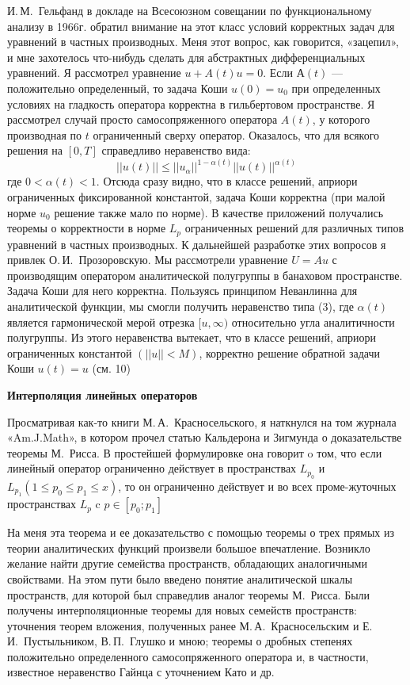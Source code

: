 И.\,М.~Гельфанд в докладе на Всесоюзном совещании по функциональному анализу в 1966г. обратил внимание на этот класс условий корректных задач для уравнений в частных производных. Меня этот вопрос, как говорится, «зацепил», и мне захотелось что-нибудь сделать для абстрактных дифференциальных уравнений. Я рассмотрел уравнение $u + A(t)u = 0$. Если $А(t)$ --- положительно определенный, то задача Коши $u(0)=u_0$ при определенных условиях на гладкость оператора корректна в гильбертовом пространстве. Я рассмотрел случай просто самосопряженного оператора $A(t)$, у которого производная по $t$ ограниченный сверху оператор. Оказалось, что для всякого решения на $[0,T]$ справедливо неравенство вида:
$$||u(t)||\leq||u_{\alpha}||^{1-\alpha(t)} ||u(t)||^{\alpha(t)}$$
где $0<\alpha(t) < 1$.
Отсюда сразу видно, что в классе решений, априори ограниченных фиксированной константой,
задача Коши корректна (при малой норме $u_0$ решение также мало по норме).
В качестве приложений получались теоремы о корректности в норме $L_p$
ограниченных решений для различных типов уравнений в частных производных.
К дальнейшей разработке этих вопросов я привлек О.\,И.~Прозоровскую. Мы рассмотрели уравнение $U = Au$ с производящим оператором аналитической полугруппы в банаховом пространстве. Задача Коши для него корректна. Пользуясь принципом Неванлинна для аналитической функции, мы смогли получить неравенство типа (3), где $\alpha(t)$
является гармонической мерой отрезка $[u, \infty)$  относительно угла аналитичности полугруппы. Из этого неравенства вытекает, что в классе решений, априори ограниченных константой $(||u||<M)$, корректно решение обратной задачи Коши $u(t) = u$ (см. 10)

{\bf Интерполяция линейных операторов}

Просматривая как-то книги М.\,А.~Красносельского, я наткнулся на том журнала «Am.J.Math»,
в котором прочел статью Кальдерона и Зигмунда о доказательстве теоремы М.~Рисса.
В простейшей формулировке она говорит o том, что если линейный оператор ограниченно действует в пространствах $L_{p_0}$ и  $L_{p_1} (1\leq p_0 \leq p_1 \leq x)$, то он ограниченно действует и во всех проме-жуточных пространствах $L_p$ c $p \in [p_0;p_1]$

На меня эта теорема и ее доказательство с помощью теоремы о трех прямых из теории аналитических функций произвели большое впечатление. Возникло желание найти другие семейства пространств, обладающих аналогичными свойствами. На этом пути было введено понятие аналитической шкалы пространств, для которой был справедлив аналог теоремы М.~Рисса. Были получены интерполяционные теоремы для новых семейств пространств: уточнения теорем вложения, полученных ранее М.\,А.~Красносельским и Е.\,И.~Пустыльником, В.\,П.~Глушко и мною; теоремы о дробных степенях положительно определенного самосопряженного оператора и, в частности, известное неравенство Гайнца с уточнением Като и др.


